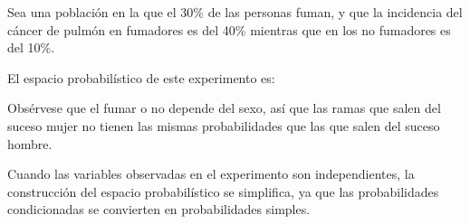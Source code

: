 \begin{ejemplo}
Sea una población en la que el 30\% de las personas fuman, y que la incidencia del cáncer de pulmón en fumadores es del 40\% mientras que 
en los no fumadores es del 10\%.

El espacio probabilístico de este experimento es:

\begin{center}
\renewcommand{\psedge}[2]{\ncdiag[armA=1.2cm,angleA=180,angleB=0,armB=0cm]{#2}{#1}} 
\end{center}

Obsérvese que el fumar o no depende del sexo, así que las ramas que salen del suceso mujer no tienen las mismas probabilidades que las que
salen del suceso hombre.
\end{ejemplo}

Cuando las variables observadas en el experimento son independientes, la construcción del espacio probabilístico se simplifica, ya que las
probabilidades condicionadas se convierten en probabilidades simples.

